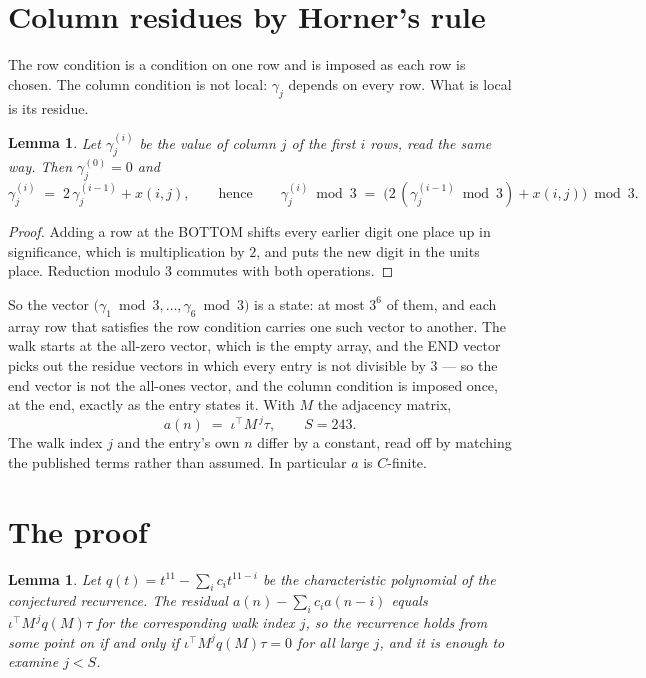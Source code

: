 \documentclass[11pt,a4paper]{article}
\theoremstyle{plain}
\newtheorem{lemma}[theorem]{Lemma}
\theoremstyle{definition}
\begin{document}
\section{Column residues by Horner's rule}

The row condition is a condition on one row and is imposed as each row is chosen. The column
condition is not local: $\gamma_j$ depends on every row. What is local is its residue.

\begin{lemma}\label{lem:horner}
Let $\gamma_j^{(i)}$ be the value of column $j$ of the first $i$ rows, read the same way.
Then $\gamma_j^{(0)}=0$ and
\[
\gamma_j^{(i)}\;=\;2\,\gamma_j^{(i-1)}+x(i,j),
\qquad\text{hence}\qquad
\gamma_j^{(i)}\bmod 3\;=\;
\bigl(2\,(\gamma_j^{(i-1)}\bmod 3)+x(i,j)\bigr)\bmod 3 .
\]
\end{lemma}

\begin{proof}
Adding a row at the BOTTOM shifts every earlier digit one place up in significance, which is
multiplication by $2$, and puts the new digit in the units place. Reduction modulo
$3$ commutes with both operations.
\end{proof}

So the vector $\bigl(\gamma_1\bmod 3,\dots,\gamma_{6}\bmod
3\bigr)$ is a state: at most $3^{6}$ of them, and each array row
that satisfies the row condition carries one such vector to another. The walk starts at the
all-zero vector, which is the empty array, and the END vector picks out the residue vectors in
which every entry is not divisible by $3$ --- so the end vector is not the all-ones
vector, and the column condition is imposed once, at the end, exactly as the entry states it.
With $M$ the adjacency matrix,
\[
a(n)\;=\;\iota^{\!\top}M^{\,j}\tau ,\qquad S=243.
\]
The walk index $j$ and the entry's own $n$ differ by a constant, read off by matching the
published terms rather than assumed. In particular $a$ is $C$-finite.

\section{The proof}

\begin{lemma}\label{lem:crit}
Let $q(t)=t^{11}-\sum_i c_it^{11-i}$ be the characteristic polynomial of the
conjectured recurrence. The residual $a(n)-\sum_ic_ia(n-i)$ equals
$\iota^{\!\top}M^{\,j}q(M)\tau$ for the corresponding walk index $j$, so the recurrence
holds from some point on if and only if $\iota^{\!\top}M^{j}q(M)\tau=0$ for all large $j$,
and it is enough to examine $j<S$.
\end{lemma}
\end{document}
